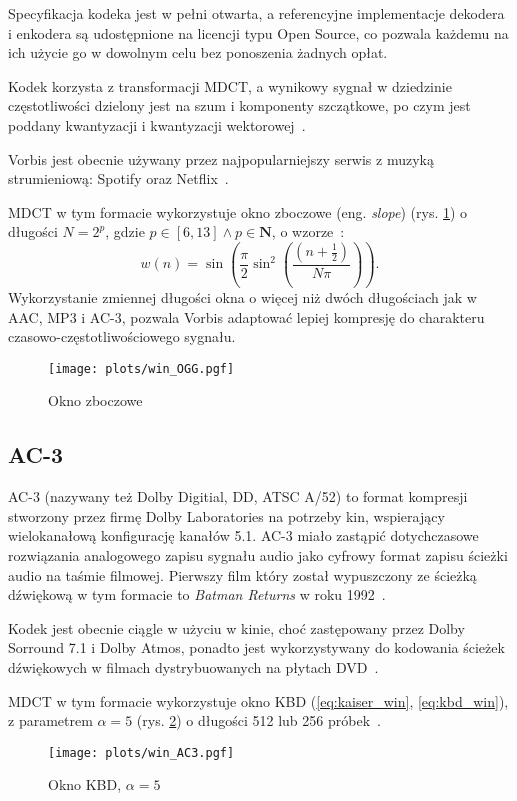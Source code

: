 \documentclass[pl,12pt]{aghdpl}
\let\Oldsubsection\subsection%
\renewcommand{\subsection}{\FloatBarrier\Oldsubsection}
\begin{document}
Specyfikacja kodeka jest w pełni otwarta, a referencyjne implementacje dekodera
i enkodera są udostępnione na licencji typu Open Source, co pozwala każdemu na
ich użycie go w dowolnym celu bez ponoszenia żadnych opłat.

Kodek korzysta z transformacji MDCT, a wynikowy sygnał w dziedzinie
częstotliwości dzielony jest na szum i komponenty szczątkowe, po czym jest
poddany kwantyzacji i kwantyzacji wektorowej~\cite{XiphVorbisDoc}.

Vorbis jest obecnie używany przez najpopularniejszy serwis z muzyką
strumieniową: Spotify oraz Netflix~\cite{SpotifyMastering, Ronca2013}.

MDCT w tym formacie wykorzystuje okno zboczowe (eng. \textit{slope}) (rys.
\ref{fig:win_OGG}) o długości $N = 2^{p}$, gdzie $p \in [6,13] \land p \in \bm
N$, o wzorze~\cite{XiphVorbisDoc}:
\begin{equation}\label{eq:slope_win}
  w(n) = \sin\left(\frac{\pi}{2}\sin^2\left(\frac{\left(n +
  \frac{1}{2}\right)}{N\pi}\right)\right).
\end{equation}
Wykorzystanie zmiennej długości okna o więcej niż dwóch długościach jak w AAC,
MP3 i AC-3, pozwala Vorbis adaptować lepiej kompresję do charakteru
czasowo-częstotliwościowego sygnału.

\begin{figure}[!tbh]
  \centering
  \texttt{[image: plots/win\_OGG.pgf]}
  \caption{Okno zboczowe}
  \label{fig:win_OGG}
\end{figure}

\subsection{AC-3}
AC-3 (nazywany też Dolby Digitial, DD, ATSC A/52) to format kompresji stworzony
przez firmę Dolby Laboratories na potrzeby kin, wspierający wielokanałową
konfigurację kanałów 5.1. AC-3 miało zastąpić dotychczasowe rozwiązania
analogowego zapisu sygnału audio jako cyfrowy format zapisu ścieżki audio na
taśmie filmowej.  Pierwszy film który został wypuszczony ze ścieżką dźwiękową w
tym formacie to \textit{Batman Returns} w roku 1992~\cite{Fisher1992}.

Kodek jest obecnie ciągle w użyciu w kinie, choć zastępowany przez Dolby
Sorround 7.1 i Dolby Atmos, ponadto jest wykorzystywany do kodowania ścieżek
dźwiękowych w filmach dystrybuowanych na płytach DVD~\cite{DolbyDigital}.

MDCT w tym formacie wykorzystuje okno KBD (\ref{eq:kaiser_win},
\ref{eq:kbd_win}), z parametrem $\alpha = 5$ (rys. \ref{fig:win_AC3}) o
długości 512 lub 256 próbek~\cite{atsc2012}.
\begin{figure}[!tbh]
  \centering
  \texttt{[image: plots/win\_AC3.pgf]}
  \caption{Okno KBD, $\alpha = 5$}
  \label{fig:win_AC3}
\end{figure}
\end{document}
